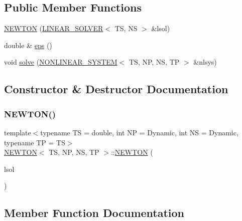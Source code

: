 \subsection*{Public Member Functions}
\begin{DoxyCompactItemize}
\item 
\mbox{\hyperlink{class_n_e_w_t_o_n_a473d598fe7f30d8895a90a7daecb5f01}{N\+E\+W\+T\+ON}} (\mbox{\hyperlink{class_l_i_n_e_a_r___s_o_l_v_e_r}{L\+I\+N\+E\+A\+R\+\_\+\+S\+O\+L\+V\+ER}}$<$ TS, NS $>$ \&lsol)
\item 
double \& \mbox{\hyperlink{class_n_e_w_t_o_n_a222247d7695d9cce96f424a49d5ad2f6}{eps}} ()
\item 
void \mbox{\hyperlink{class_n_e_w_t_o_n_a1dd31b882567d3e0427eb53ce169f0ce}{solve}} (\mbox{\hyperlink{class_n_o_n_l_i_n_e_a_r___s_y_s_t_e_m}{N\+O\+N\+L\+I\+N\+E\+A\+R\+\_\+\+S\+Y\+S\+T\+EM}}$<$ TS, NP, NS, TP $>$ \&nlsys)
\end{DoxyCompactItemize}


\subsection{Constructor \& Destructor Documentation}
\mbox{\label{class_n_e_w_t_o_n_a473d598fe7f30d8895a90a7daecb5f01}} 
\subsubsection{\texorpdfstring{N\+E\+W\+T\+O\+N()}{NEWTON()}}
{\footnotesize\ttfamily template$<$typename TS  = double, int NP = Dynamic, int NS = Dynamic, typename TP  = TS$>$ \\
\mbox{\hyperlink{class_n_e_w_t_o_n}{N\+E\+W\+T\+ON}}$<$ TS, NP, NS, TP $>$\+::\mbox{\hyperlink{class_n_e_w_t_o_n}{N\+E\+W\+T\+ON}} (\begin{DoxyParamCaption}\item[{\mbox{\hyperlink{class_l_i_n_e_a_r___s_o_l_v_e_r}{L\+I\+N\+E\+A\+R\+\_\+\+S\+O\+L\+V\+ER}}$<$ TS, NS $>$ \&}]{lsol }\end{DoxyParamCaption})\hspace{0.3cm}{\ttfamily [inline]}}



\subsection{Member Function Documentation}
\mbox{\label{class_n_e_w_t_o_n_a222247d7695d9cce96f424a49d5ad2f6}} 
